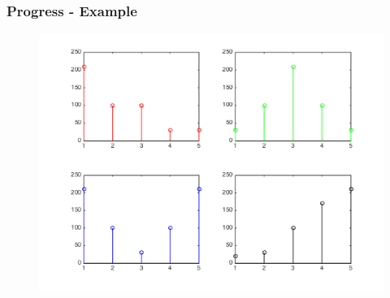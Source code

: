 \documentclass{beamer}
\begin{document}
\begin{frame}
    \frametitle{Progress - Example}

    \begin{figure}[H]
        \centering
        \includegraphics[scale=0.3]{toyImageProfiles.png}
    \end{figure}


\end{frame}
\end{document}
